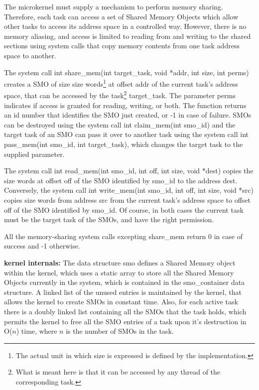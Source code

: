 \documentclass[11pt, letterpaper, twoside, english]{book}
\begin{document}
The microkernel must supply a mechanism to perform memory sharing. Therefore, each task can access a set of Shared Memory Objects which allow other tasks to access its address space in a controlled way. However, there is no memory aliasing, and access is limited to reading from and writing to the shared sections using system calls that copy memory contents from one task address space to another.

The system call \textsf{int share\_mem(int target\_task, void *addr, int size, int perms)} creates a SMO of size \textsf{size} words\footnote{The actual unit in which size is expressed is defined by the implementation.} at offset \textsf{addr} of the current task's address space, that can be accessed by the task\footnote{What is meant here is that it can be accessed by any thread of the corresponding task.} \textsf{target\_task}. The parameter \textsf{perms} indicates if access is granted for reading, writing, or both. The function returns an id number that identifies the SMO just created, or -1 in case of failure. SMOs can be destroyed using the system call \textsf{int claim\_mem(int smo\_id)} and the target task of an SMO can pass it over to another task using the system call \textsf{int pass\_mem(int smo\_id, int target\_task)}, which changes the target task to the supplied parameter.

The system call \textsf{int read\_mem(int smo\_id, int off, int size, void *dest)} copies the \textsf{size} words at offset \textsf{off} of the SMO identified by \textsf{smo\_id} to the address \textsf{dest}. Conversely, the system call \textsf{int write\_mem(int smo\_id, int off, int size, void *src)} copies \textsf{size} words from address \textsf{src} from the current task's address space to offset \textsf{off} of the SMO identified by \textsf{smo\_id}. Of course, in both cases the current task must be the target task of the SMOs, and have the right permission.

All the memory-sharing system calls excepting \textsf{share\_mem} return 0 in case of success and -1 otherwise.

\textbf{kernel internals:} The data structure \textsf{smo} defines a Shared Memory object within the kernel, which uses a static array to store all the Shared Memory Objects currently in the system, which is contained in the \textsf{smo\_container} data structure. A linked list of the unused entries is maintained by the kernel, that allows the kernel to create SMOs in constant time. Also, for each active task there is a doubly linked list containing all the SMOs that the task holds, which permits the kernel to free all the SMO entries of a task upon it's destruction in O($n$) time, where $n$ is the number of SMOs in the task.
\end{document}

